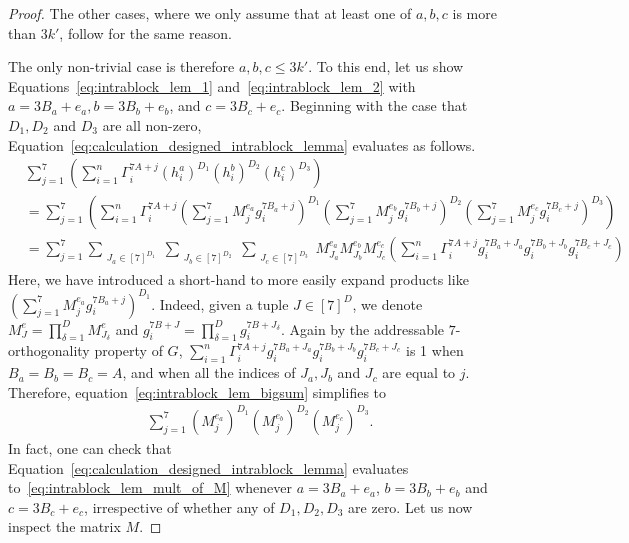 \documentclass[11pt]{article}
\theoremstyle{definition}
\renewcommand{\leq}{\leqslant}
\begin{document}
\begin{proof}
    The other cases, where we only assume that at least one of $a,b,c$ is more than $3k'$, follow for the same reason.

    The only non-trivial case is therefore $a,b,c \leq 3k'$. To this end, let us show Equations~\eqref{eq:intrablock_lem_1} and~\eqref{eq:intrablock_lem_2} with $a = 3B_a + e_a, b = 3B_b + e_b$, and $c = 3B_c + e_c$. 
    Beginning with the case that $D_1, D_2$ and $D_3$ are all non-zero, Equation~\eqref{eq:calculation_designed_intrablock_lemma} evaluates as follows. 
    \begin{align}
        &\sum_{j=1}^7 \left(\sum_{i=1}^n \Gamma^{7A+j}_i (h^{a}_i)^{D_1} (h^b_i)^{D_2}(h^c_i)^{D_3}\right) \\
        &= \sum_{j=1}^7 \left(\sum_{i=1}^n \Gamma^{7A+j}_i 
        \left(\sum_{j=1}^7 M^{e_a}_{j} g^{7B_a+j}_i \right)^{D_1} 
        \left(\sum_{j=1}^7 M^{e_b}_{j} g^{7B_b+j}_i \right)^{D_2} 
        \left(\sum_{j=1}^7 M^{e_c}_{j} g^{7B_c+j}_i \right)^{D_3}
        \right) \\
        &= \sum_{j=1}^7 
        \sum_{\substack{J_a\in [7]^{D_1}}}
        \sum_{\substack{J_b\in [7]^{D_2}}}
        \sum_{\substack{J_c\in [7]^{D_3}}}
        M^{e_a}_{J_a}M^{e_b}_{J_b}M^{e_c}_{J_c}
        \left(
        \sum_{i=1}^n \Gamma^{7A+j}_i g_i^{7B_a + J_a}g_i^{7B_b + J_b} g_i^{7B_c + J_c} \right) \label{eq:intrablock_lem_bigsum}
    \end{align}
    Here, we have introduced a short-hand to more easily expand products like $\left(\sum_{j=1}^7M_j^{e_a}g_i^{7B_a+j}\right)^{D_1}$. Indeed, given a tuple $J\in [7]^D$, we denote $M^e_J = \prod_{\delta = 1}^D M^e_{J_\delta}$ and $g^{7B+J}_i = \prod_{\delta = 1}^D g^{7B + J_\delta}_i$.
    Again by the addressable $7$-orthogonality property of $G$, $\sum_{i=1}^n \Gamma^{7A+j}_i g_i^{7B_a + J_a}g_i^{7B_b + J_b} g_i^{7B_c + J_c}$ is 1 when $B_a = B_b = B_c = A$, and when all the indices of $J_a, J_b$ and $J_c$ are equal to $j$.
    Therefore, equation~\eqref{eq:intrablock_lem_bigsum} simplifies to
    \begin{align}
        \sum_{j=1}^7 
        (M^{e_a}_{j})^{D_1} (M^{e_b}_{j})^{D_2} (M^{e_c}_{j})^{D_3}.
        \label{eq:intrablock_lem_mult_of_M}
    \end{align}
    In fact, one can check that Equation~\eqref{eq:calculation_designed_intrablock_lemma} evaluates to~\eqref{eq:intrablock_lem_mult_of_M} whenever $a=3B_a+e_a$, $b=3B_b+e_b$ and $c=3B_c+e_c$, irrespective of whether any of $D_1, D_2, D_3$ are zero.
    Let us now inspect the matrix $M$. 

\end{proof}
\end{document}
